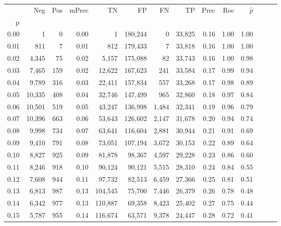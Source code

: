 \begin{tabular}{rrrrrrrrrrrrrr}
\toprule
{} &     Neg &  Pos & mPrec &       TN &       FP &      FN &      TP &  Prec &   Rec & $\hat{p}$ \\
p    &         &      &       &          &          &         &         &       &       &           \\
\midrule
0.00 &       1 &    0 &  0.00 &        1 &  180,244 &       0 &  33,825 &  0.16 &  1.00 &      1.00 \\
0.01 &     811 &    7 &  0.01 &      812 &  179,433 &       7 &  33,818 &  0.16 &  1.00 &      1.00 \\
0.02 &   4,345 &   75 &  0.02 &    5,157 &  175,088 &      82 &  33,743 &  0.16 &  1.00 &      0.98 \\
0.03 &   7,465 &  159 &  0.02 &   12,622 &  167,623 &     241 &  33,584 &  0.17 &  0.99 &      0.94 \\
0.04 &   9,789 &  316 &  0.03 &   22,411 &  157,834 &     557 &  33,268 &  0.17 &  0.98 &      0.89 \\
0.05 &  10,335 &  408 &  0.04 &   32,746 &  147,499 &     965 &  32,860 &  0.18 &  0.97 &      0.84 \\
0.06 &  10,501 &  519 &  0.05 &   43,247 &  136,998 &   1,484 &  32,341 &  0.19 &  0.96 &      0.79 \\
0.07 &  10,396 &  663 &  0.06 &   53,643 &  126,602 &   2,147 &  31,678 &  0.20 &  0.94 &      0.74 \\
0.08 &   9,998 &  734 &  0.07 &   63,641 &  116,604 &   2,881 &  30,944 &  0.21 &  0.91 &      0.69 \\
0.09 &   9,410 &  791 &  0.08 &   73,051 &  107,194 &   3,672 &  30,153 &  0.22 &  0.89 &      0.64 \\
0.10 &   8,827 &  925 &  0.09 &   81,878 &   98,367 &   4,597 &  29,228 &  0.23 &  0.86 &      0.60 \\
0.11 &   8,246 &  918 &  0.10 &   90,124 &   90,121 &   5,515 &  28,310 &  0.24 &  0.84 &      0.55 \\
0.12 &   7,608 &  944 &  0.11 &   97,732 &   82,513 &   6,459 &  27,366 &  0.25 &  0.81 &      0.51 \\
0.13 &   6,813 &  987 &  0.13 &  104,545 &   75,700 &   7,446 &  26,379 &  0.26 &  0.78 &      0.48 \\
0.14 &   6,342 &  977 &  0.13 &  110,887 &   69,358 &   8,423 &  25,402 &  0.27 &  0.75 &      0.44 \\
0.15 &   5,787 &  955 &  0.14 &  116,674 &   63,571 &   9,378 &  24,447 &  0.28 &  0.72 &      0.41 \\

\end{tabular}
